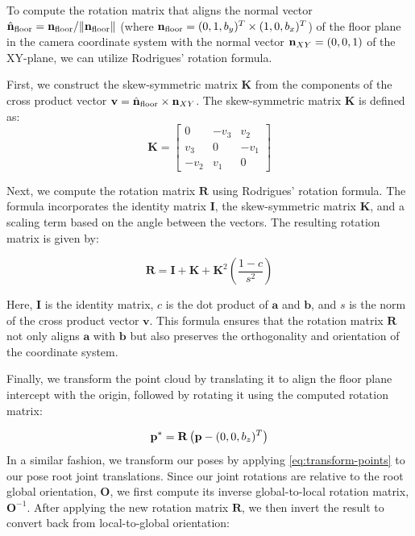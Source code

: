 To compute the rotation matrix that aligns the normal vector $\hat{\boldsymbol{\mathbf{n}}}_\text{floor} = \boldsymbol{\mathbf{n}}_\text{floor} / \| \boldsymbol{\mathbf{n}}_\text{floor} \|$ (where $\boldsymbol{\mathbf{n}}_\text{floor} = (0, 1, b_y)^T \times (1, 0, b_x)^T$) of the floor plane in the camera coordinate system with the normal vector $\boldsymbol{\mathbf{n}}_{XY} = (0, 0, 1)$ of the XY-plane, we can utilize Rodrigues' rotation formula. 

First, we construct the skew-symmetric matrix $\mathbf{K}$ from the components of the cross product vector $\boldsymbol{\mathbf{v}} = \hat{\boldsymbol{\mathbf{n}}}_\text{floor} \times \boldsymbol{\mathbf{n}}_{XY}$. The skew-symmetric matrix $\mathbf{K}$ is defined as:
\begin{equation}
    \mathbf{K} = \begin{bmatrix}
        0 & -v_3 & v_2 \\
        v_3 & 0 & -v_1 \\
        -v_2 & v_1 & 0
    \end{bmatrix}
\end{equation}

Next, we compute the rotation matrix $\mathbf{R}$ using Rodrigues' rotation formula. The formula incorporates the identity matrix $\mathbf{I}$, the skew-symmetric matrix $\mathbf{K}$, and a scaling term based on the angle between the vectors. The resulting rotation matrix is given by:

\begin{equation}
    \mathbf{R} = \mathbf{I} + \mathbf{K} + \mathbf{K}^2 \left(\frac{1 - c}{s^2}\right)
\end{equation}

Here, $\mathbf{I}$ is the identity matrix, $c$ is the dot product of $\mathbf{a}$ and $\mathbf{b}$, and $s$ is the norm of the cross product vector $\mathbf{v}$. This formula ensures that the rotation matrix $\mathbf{R}$ not only aligns $\mathbf{a}$ with $\mathbf{b}$ but also preserves the orthogonality and orientation of the coordinate system.

Finally, we transform the point cloud by translating it to align the floor plane intercept with the origin, followed by rotating it using the computed rotation matrix:

\begin{equation} \label{eq:transform-points}
    \boldsymbol{\mathbf{p}}^* = \mathbf{R} \left(\boldsymbol{\mathbf{p}} - (0, 0, b_z)^T \right) 
\end{equation}
In a similar fashion, we transform our poses by applying \cref{eq:transform-points} to our pose root joint translations. Since our joint rotations are relative to the root global orientation, $\mathbf{O}$, we first compute its inverse global-to-local rotation matrix, $\mathbf{O}^{-1}$. After applying the new rotation matrix $\mathbf{R}$, we then invert the result to convert back from local-to-global orientation:

